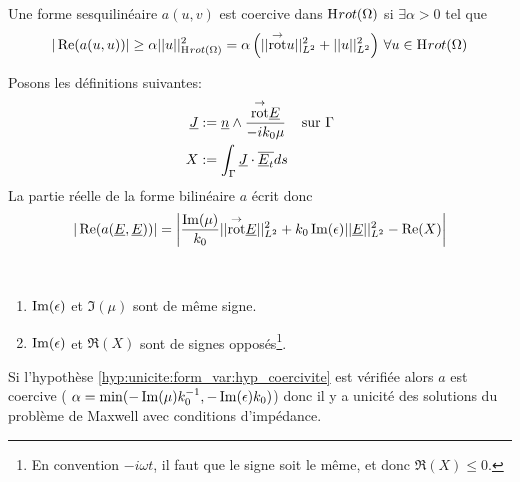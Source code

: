  \begin{defn}[Coercivité]
 Une forme sesquilinéaire $a(u,v)$ est coercive dans $\mathrm{H}_\mathrm{{}}{rot}(\Omega)$ si $\exists \alpha > 0$ tel que 
 \[
 |\operatorname{Re}(a(u,u))| \ge \alpha ||u||_{\mathrm{H}_\mathrm{{}}{rot}(\Omega)}^2 = \alpha \left( || {{\overset{\rightarrow}{\operatorname{rot}}}} u ||_{L^2}^2 + || u ||_{L^2}^2\right) \, \forall u \in \mathrm{H}_\mathrm{{}}{rot}(\Omega)
 \]
 \end{defn}


Posons les définitions suivantes:
\begin{align*}
\underline{J} &:=  \underline{n} \wedge \dfrac{{{\overset{\rightarrow}{\operatorname{rot}}}} \underline{E}}{-ik_0\mu} && \text{sur $\Gamma$}
\\X&:= \int_\Gamma \underline{J} \cdot {\overline{\underline{E}_t}} ds
\end{align*}
La partie réelle de la forme bilinéaire $a$ écrit donc
\begin{equation}
\label{eq:unicite:form_var:decomp_form_bilin_1}
|\operatorname{Re}(a(\underline{E},\underline{E}))| = \left|\dfrac{\operatorname{Im}(\mu)}{k_0} || {{\overset{\rightarrow}{\operatorname{rot}}}} \underline{E} ||_{L^2}^2  + k_0 \operatorname{Im}(\epsilon) || \underline{E} ||_{L^2}^2
- \operatorname{Re}(X)\right|
\end{equation}

\begin{hyp}\label{hyp:unicite:form_var:hyp_coercivite}
~{}

\begin{enumerate}
  \item $\operatorname{Im}(\epsilon)$ et $\Im(\mu)$ sont de même signe.
  \item $\operatorname{Im}(\epsilon)$ et $\Re(X)$ sont de signes opposés\footnote{En convention $-i\omega t$, il faut que le signe soit le même, et donc $\Re(X) \le 0$.}.
\end{enumerate}
\end{hyp}
Si l'hypothèse \ref{hyp:unicite:form_var:hyp_coercivite} est vérifiée alors $a$ est coercive ( $\alpha = \min(-\operatorname{Im}(\mu)k_0^{-1},-\operatorname{Im}(\epsilon)k_0)$) donc il y a unicité des solutions du problème de Maxwell avec conditions d'impédance.


